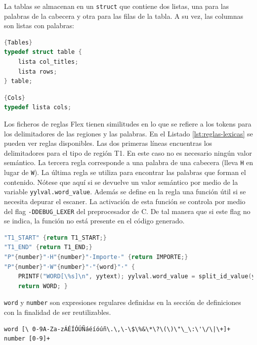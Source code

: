 La tablas se almacenan en un \verb|struct| que contiene dos listas, una para las palabras de la cabecera y otra para las filas de la tabla. A su vez, las columnas son listas con palabras:

\noindent\begin{minipage}{.45\textwidth}
    \begin{lstlisting}[language=C,caption={},frame=tlrb,label={}]{Tables}
typedef struct table {
    lista col_titles;
    lista rows;
} table;
    \end{lstlisting}
\end{minipage}\hfill
\begin{minipage}{.45\textwidth}
    \begin{lstlisting}[language=C,caption={},frame=tlrb,label={}]{Cols}
typedef lista cols;
    \end{lstlisting}
\end{minipage}

Los ficheros de reglas Flex tienen similitudes en lo que se refiere a los tokens para los delimitadores de las regiones y las palabras. En el Listado \ref{lst:reglas-lexicas} se pueden ver reglas disponibles. Las dos primeras líneas encuentras los delimitadores para el tipo de región T1. En este caso no es necesario ningún valor semántico. La tercera regla corresponde a una palabra de una cabecera (lleva \verb|H| en lugar de \verb|W|). La última regla se utiliza para encontrar las palabras que forman el contenido. Nótese que aquí si se devuelve un valor semántico por medio de la variable \verb|yylval.word_value|. Además se define en la regla una función útil si se necesita depurar el escaner. La activación de esta función se controla por medio del flag \verb|-DDEBUG_LEXER| del preprocesador de C. De tal manera que si este flag no se indica, la función no está presente en el código generado.

\begin{lstlisting}[language=C,caption={Reglas léxicas habituales},label={lst:reglas-lexicas}]
"T1_START" {return T1_START;}
"T1_END" {return T1_END;}
"P"{number}"·H"{number}"·Importe·" {return IMPORTE;}
"P"{number}"·W"{number}"·"{word}"·" {
    PRINTF("WORD[\%s]\n", yytext); yylval.word_value = split_id_value(yytext);
    return WORD; }
\end{lstlisting}

\verb|word| y \verb|number| son expresiones regulares definidas en la sección de definiciones con la finalidad de ser reutilizables.

\begin{lstlisting}[caption={Expresiones regulares para palabras y números},label={lst:word-and-number}]
word [\ 0-9A-Za-zÁÉÍÓÚÑáéíóúñ\.\,\-\$\%&\*\?\(\)\"\_\:\'\/\|\+]+
number [0-9]+
\end{lstlisting}

